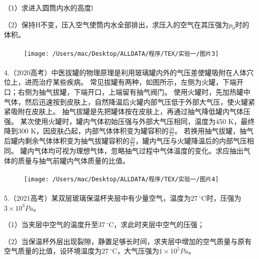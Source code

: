 \documentclass[UTF8]{ctexart}
\begin{document}
    （1）求进入圆筒内水的高度l

    （2）保持H不变，压入空气使筒内水全部排出，求压入的空气在其压强为$p_{0}$时的体积。


\begin{figure}[htbp]
\paragraph{} \texttt{[image: /Users/mac/Desktop/ALLDATA/程序/TEX/实验一/图片3]}\label{fig:figure1}
\end{figure}

\paragraph{}
    4.（2020高考）中医拔罐的物理原理是利用玻璃罐内外的气压差使罐吸附在人体穴位上，进而治疗某些疾病。
    常见拔罐有两种，如图所示，左侧为火罐，下端开口；右侧为抽气拔罐，下端开口，上端留有抽气阀门。
    使用火罐时，先加热罐中气体，然后迅速按到皮肤上，自然降温后火罐内部气压低于外部大气压，使火罐紧紧吸附在皮肤上。
    抽气拔罐是先把罐体按在皮肤上，再通过抽气降低罐内气体压强。
    某次使用火罐时，罐内气体初始压强与外部大气压相同，温度为450 K，最终降到300 K，因皮肤凸起，内部气体体积变为罐容积的$\frac{20}{21}$。
    若换用抽气拔罐，抽气后罐内剩余气体体积变为抽气拔罐容积的$\frac{20}{21}$，罐内气压与火罐降温后的内部气压相同。
    罐内气体均可视为理想气体，忽略抽气过程中气体温度的变化。求应抽出气体的质量与抽气前罐内气体质量的比值。

\begin{figure}[htbp]
\paragraph{} \texttt{[image: /Users/mac/Desktop/ALLDATA/程序/TEX/实验一/图片4]}\label{fig:figure2}
\end{figure}


\paragraph{}
    5.（2021高考）某双层玻璃保温杯夹层中有少量空气，温度为$27\,^{\circ}\mathrm{C}$时，压强为$3 \times 10^{3}Pa$。

    （1）当夹层中空气的温度升至$37\,^{\circ}\mathrm{C}$，求此时夹层中空气的压强；

    （2）当保温杯外层出现裂隙，静置足够长时间，求夹层中增加的空气质量与原有空气质量的比值，设环境温度为$27\,^{\circ}\mathrm{C}$，大气压强为$1 \times 10^{5}Pa$。
\end{document}
